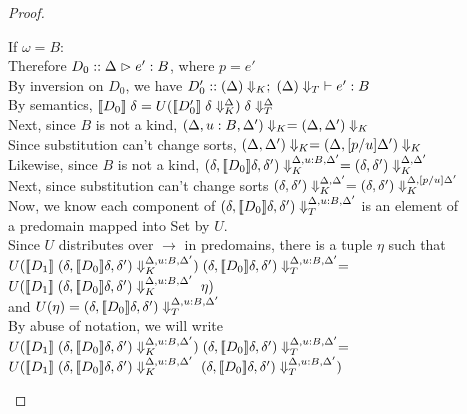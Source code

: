 \begin{proof}
\begin{enumerate}
\begin{itemize}
\begin{tabbedproof}
      \ooo If $\omega = B$: \\
      \oooo Therefore $D_0 :: \judgeA{e'}{B}$, where $p = e'$ \\
      \oooo By inversion on $D_0$, we have 
            $D'_0 :: \judgeE[\restrictkind{\Delta}]{\restricttype{\Delta}}{e'}{B}$ \\
      \oooo By semantics, $\interp{D_0}\;\delta = U(\interp{D'_0}\;\restricttyenv{\Delta}{\delta})\;\restrictvals{\Delta}{\delta}$ \\
      \oooo Next, since $B$ is not a kind, 
            $\restrictkind{\Delta, u:B, \Delta'} = \restrictkind{\Delta, \Delta'}$ \\
      \oooo Since substitution can't change sorts, $\restrictkind{\Delta, \Delta'} = \restrictkind{\Delta, [p/u]\Delta'}$ \\
      \oooo Likewise, since $B$ is not a kind, $\restricttyenv{\Delta, u:B, \Delta'}{(\delta, \interp{D_0}\delta, \delta')}
            = \restricttyenv{\Delta, \Delta'}{(\delta, \delta')}$ \\
      \oooo Next, since substitution can't change sorts
            $\restricttyenv{\Delta, \Delta'}{(\delta, \delta')} = 
             \restricttyenv{\Delta, [p/u]\Delta'}{(\delta, \delta')}$ \\
      \oooo Now, we know each component of $\restrictvals{\Delta,u:B,\Delta'}{(\delta, \interp{D_0}\delta, \delta')}$ is an element of \\
      \ooox a predomain mapped into Set by $U$. \\
      \oooo Since $U$ distributes over $\to$ in predomains, there is a tuple $\eta$ such that \\
      \oooox $U(\interp{D_1}\;\restricttyenv{\Delta,u:B,\Delta'}{(\delta, \interp{D_0}\delta,\delta')})\;\restrictvals{\Delta,u:B,\Delta'}{(\delta,\interp{D_0}\delta,\delta')} = $ \\
      \oooox $U(\interp{D_1}\;\restricttyenv{\Delta,u:B,\Delta'}{(\delta, \interp{D_0}\delta,\delta')}\;\eta)$ \\
      \oooox and $U(\eta) = \restrictvals{\Delta,u:B,\Delta'}{(\delta,\interp{D_0}\delta,\delta')}$ \\
      \oooo By abuse of notation, we will write \\
      \oooox $U(\interp{D_1}\;\restricttyenv{\Delta,u:B,\Delta'}{(\delta, \interp{D_0}\delta,\delta')})\;\restrictvals{\Delta,u:B,\Delta'}{(\delta,\interp{D_0}\delta,\delta')} = $ \\
      \oooox $U(\interp{D_1}\;\restricttyenv{\Delta,u:B,\Delta'}{(\delta, \interp{D_0}\delta,\delta')}\;\restrictvals{\Delta,u:B,\Delta'}{(\delta,\interp{D_0}\delta,\delta')})$ \\

\end{tabbedproof}
\end{itemize}
\end{enumerate}
\end{proof}
